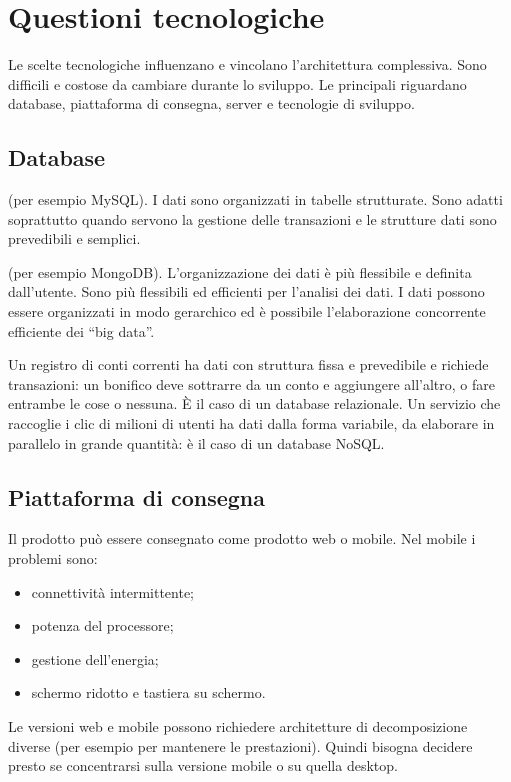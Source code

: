 \section{Questioni tecnologiche}
\label{sec:arch-tecnologie}

Le scelte tecnologiche influenzano e vincolano l'architettura complessiva. Sono difficili e costose da cambiare
durante lo sviluppo. Le principali riguardano database, piattaforma di consegna, server e tecnologie di sviluppo.

\subsection{Database}

\begin{description}[leftmargin=0pt, style=unboxed]
  \item[Database relazionali] (per esempio MySQL). I dati sono organizzati in tabelle strutturate. Sono adatti soprattutto
    quando servono la gestione delle transazioni e le strutture dati sono prevedibili e semplici.
  \item[Database NoSQL] (per esempio MongoDB). L'organizzazione dei dati è più flessibile e definita dall'utente.
    Sono più flessibili ed efficienti per l'analisi dei dati. I dati possono essere organizzati in modo gerarchico ed
    è possibile l'elaborazione concorrente efficiente dei ``big data''.
\end{description}

\begin{esempio}
Un registro di conti correnti ha dati con struttura fissa e prevedibile e richiede transazioni: un bonifico deve
sottrarre da un conto e aggiungere all'altro, o fare entrambe le cose o nessuna. È il caso di un database relazionale.
Un servizio che raccoglie i clic di milioni di utenti ha dati dalla forma variabile, da elaborare in parallelo in
grande quantità: è il caso di un database NoSQL.
\end{esempio}

\subsection{Piattaforma di consegna}

Il prodotto può essere consegnato come prodotto web o mobile. Nel mobile i problemi sono:
\begin{itemize}
  \item connettività intermittente;
  \item potenza del processore;
  \item gestione dell'energia;
  \item schermo ridotto e tastiera su schermo.
\end{itemize}
Le versioni web e mobile possono richiedere architetture di decomposizione diverse (per esempio per mantenere le
prestazioni). Quindi bisogna decidere presto se concentrarsi sulla versione mobile o su quella desktop.


